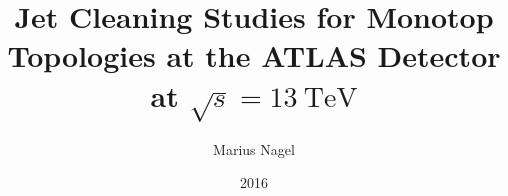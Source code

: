 \documentclass[
  BCOR=12mm,     %
  parskip=half,  %
  open=any,      %
  cleardoublepage=plain,  %
]{tudothesis}
\author{Marius Nagel}
\title{\boldmath Jet Cleaning Studies for Monotop Topologies at the ATLAS Detector at $\sqrt{s}=\SI{13}{\tera\electronvolt}$\unboldmath}
\date{2016}
\begin{document}
\frontmatter

\maketitle

\makecorrectorpage


\tableofcontents

\mainmatter
%






\appendix
%

\printbibliography

\cleardoublepage

\end{document}
